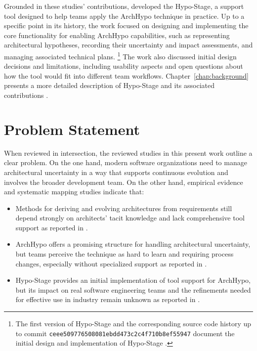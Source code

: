 Grounded in these studies' contributions, \citet{correa2025} developed the Hypo-Stage, a support tool designed to help teams apply the ArchHypo technique in practice.
Up to a specific point in its history, the work focused on designing and implementing the core functionality for enabling ArchHypo capabilities, such as representing architectural hypotheses, recording their uncertainty and impact assessments, and managing associated technical plans. \footnote{The first version of Hypo-Stage and the corresponding source code history up to commit \texttt{ceee509776508081ebdd473c2c4f710b8ef55947} document the initial design and implementation of Hypo-Stage \citep{correa2025}.} 
The work also discussed initial design decisions and limitations, including usability aspects and open questions about how the tool would fit into different team workflows.
Chapter~\ref{chap:background} presents a more detailed description of Hypo-Stage and its associated contributions \citep{correa2025}.

\section{Problem Statement}

When reviewed in intersection, the reviewed studies in this present work outline a clear problem. 
On the one hand, modern software organizations need to manage architectural uncertainty in a way that supports continuous evolution and involves the broader development team. 
On the other hand, empirical evidence and systematic mapping studies indicate that:

\begin{itemize}
  \item Methods for deriving and evolving architectures from requirements still depend strongly on architects' tacit knowledge and lack comprehensive tool support as reported in \citet{souza2019}.
  \item ArchHypo offers a promising structure for handling architectural uncertainty, but teams perceive the technique as hard to learn and requiring process changes, especially without specialized support as reported in \citet{silva2024tse,silva2024ieeesw}.
  \item Hypo-Stage provides an initial implementation of tool support for ArchHypo, but its impact on real software engineering teams and the refinements needed for effective use in industry remain unknown as reported in \citet{correa2025}.
\end{itemize}

